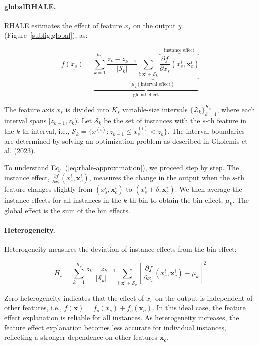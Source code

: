 \documentclass[
twocolumn,
]{ceurart}
\newcommand{\xb}{\mathbf{x}}
\newcommand{\xc}{\mathbf{x_c}}
\newcommand{\xci}{\mathbf{x}^i_c}
\begin{document}
\paragraph{globalRHALE.}

RHALE esitmates the effect of feature $x_s$ on the output $y$ (Figure~\ref{subfig:global}), as:

\begin{equation}
  \label{eq:rhale-approximation}
f(x_s) = \underbrace{\sum_{k=1}^{k_{x_s}} \underbrace{\frac{z_k - z_{k-1}}{ \left | \mathcal{S}_k \right |} \sum_{i: \xb^i \in \mathcal{S}_k} \overbrace{\frac{\partial f}{\partial x_s} (x_s^i, \xci)}^{\text{instance effect}}}_{\mu_k (\text{interval effect})}}_{\text{global effect}}
\end{equation}

\noindent
The feature axis $x_s$ is divided into $K_s$ variable-size intervals $\{\mathcal{Z}_k\}_{k=1}^{K_s}$, where each interval spans $[z_{k-1}, z_k)$. Let $\mathcal{S}_k$ be the set of instances with the $s$-th feature in the $k$-th interval, i.e., $\mathcal{S}_k = \{ x^{(i)} : z_{k-1} \leq x^{(i)}_s < z_k \}$. The interval boundaries are determined by solving an optimization problem as described in Gkolemis et al. (2023).

To understand Eq.~(\ref{eq:rhale-approximation}), we proceed step by step. The instance effect, $\frac{\partial f}{\partial x_s} (x_s^i, \xci)$, measures the change in the output when the $s$-th feature changes slightly from $(x_s^i, \xci)$ to $(x_s^i + \delta, \xci)$. We then average the instance effects for all instances in the $k$-th bin to obtain the bin effect, $\mu_k$. The global effect is the sum of the bin effects.

\paragraph{Heterogeneity.}

Heterogeneity measures the deviation of instance effects from the bin effect:

\begin{equation}
  \label{eq:rhale-approximation-heterogeneity}
  H_s = \sum_{k=1}^{K_s} \frac{z_k - z_{k-1}}{|\mathcal{S}_k|}\sum_{i: \xb^i \in \mathcal{S}_k} \left [ \frac{\partial f}{\partial x_s} (x_s^i, \xci) - \mu_k \right ]^2
\end{equation}

\noindent
Zero heterogeneity indicates that the effect of $x_s$ on the output is independent of other features, i.e., \( f(\xb) = f_s(x_s) + f_c(\xc) \). In this ideal case, the feature effect explanation is reliable for all instances. As heterogeneity increases, the feature effect explanation becomes less accurate for individual instances, reflecting a stronger dependence on other features $\xc$. 
\end{document}
